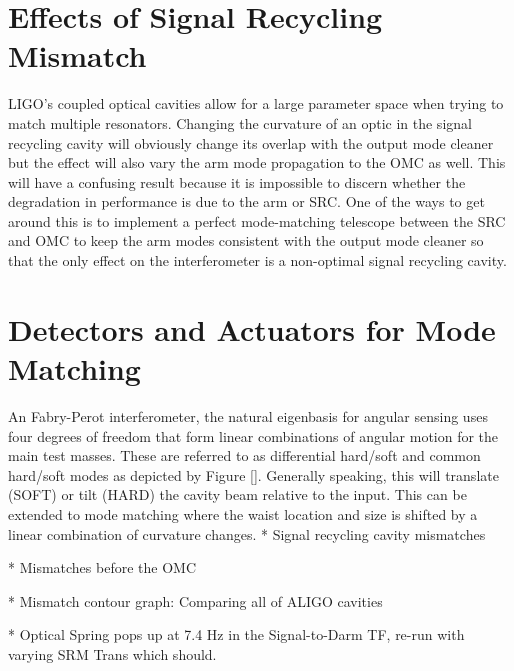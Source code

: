 	\section{Effects of Signal Recycling Mismatch}
		LIGO's coupled optical cavities allow for a large parameter space when trying to match multiple resonators.   Changing the curvature of an optic in the signal recycling cavity will obviously change its overlap with the output mode cleaner but the effect will also vary the arm mode propagation to the OMC as well.  This will have a confusing result because it is impossible to discern whether the degradation in performance is due to the arm or SRC.  One of the ways to get around this is to implement a perfect mode-matching telescope between the SRC and OMC to keep the arm modes consistent with the output mode cleaner so that the only effect on the interferometer is a non-optimal signal recycling cavity.
		
	\section{Detectors and Actuators for Mode Matching}
	An Fabry-Perot interferometer, the natural eigenbasis for angular sensing uses four degrees of freedom that form linear combinations of angular motion for the main test masses.  These are referred to as differential hard/soft and common hard/soft modes as depicted by Figure [].  Generally speaking, this will translate (SOFT) or tilt (HARD) the cavity beam relative to the input.  This can be extended to mode matching where the waist location and size is shifted by a linear combination of curvature changes.
		* Signal recycling cavity mismatches

		* Mismatches before the OMC
			
		* Mismatch contour graph: Comparing all of ALIGO cavities
		
		* Optical Spring pops up at 7.4 Hz in the Signal-to-Darm TF, re-run with varying SRM Trans which should.